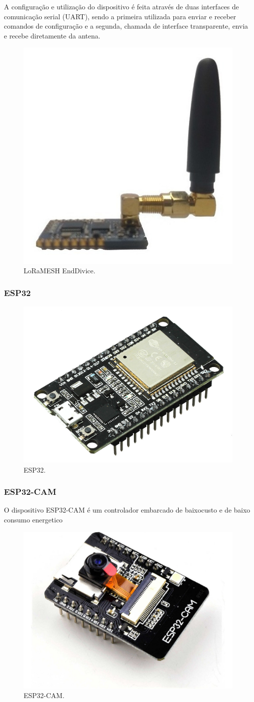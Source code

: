 \documentclass[
article,			%
12pt,				%
oneside,			%
a4paper,			%
english,			%
brazil,				%
sumario=tradicional
]{abntex2}
\begin{document}
A configuração e utilização do dispositivo é feita através de duas interfaces de comunicação serial (UART), sendo a primeira utilizada para enviar e receber comandos de configuração e a segunda, chamada de interface transparente, envia e recebe diretamente da antena.

\begin{figure}[!h]
  \caption{\label{fig:recivier}LoRaMESH EndDivice.}
  \centering
  \includegraphics[width=.5\textwidth]{lora}
\end{figure}

\subsubsection{ESP32}\label{ESP32}

\begin{figure}[!h]
  \caption{\label{fig:recivier}ESP32.}
  \centering
  \includegraphics[width=.5\textwidth]{esp}
\end{figure}

\subsubsection{ESP32-CAM}\label{ESP32-CAM}
O dispositivo ESP32-CAM é um controlador embarcado de baixocusto e de baixo consumo energetico

\begin{figure}[!h]
  \caption{\label{fig:recivier}ESP32-CAM.}
  \centering
  \includegraphics[width=.5\textwidth]{espcam}
\end{figure}
\end{document}

